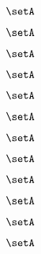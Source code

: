 \begin{forslides}
\begin{forslides}
    \begin{equation}
        \label{eq:slides-translation-121}
        \setA
    \end{equation}

    \begin{equation}
        \label{eq:slides-translation-122}
        \setA
    \end{equation}

    \begin{equation}
        \label{eq:slides-translation-123}
        \setA
    \end{equation}

    \begin{equation}
        \label{eq:slides-translation-124}
        \setA
    \end{equation}

    \begin{equation}
        \label{eq:slides-translation-125}
        \setA
    \end{equation}

    \begin{equation}
        \label{eq:slides-translation-126}
        \setA
    \end{equation}

    \begin{equation}
        \label{eq:slides-translation-127}
        \setA
    \end{equation}

    \begin{equation}
        \label{eq:slides-translation-128}
        \setA
    \end{equation}

    \begin{equation}
        \label{eq:slides-translation-129}
        \setA
    \end{equation}

    \begin{equation}
        \label{eq:slides-translation-130}
        \setA
    \end{equation}

    \begin{equation}
        \label{eq:slides-translation-131}
        \setA
    \end{equation}

    \begin{equation}
        \label{eq:slides-translation-132}
        \setA
    \end{equation}


\end{forslides}
\end{forslides}
